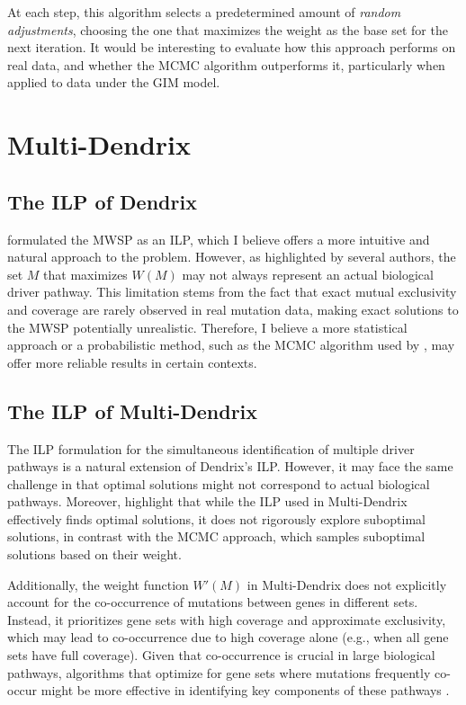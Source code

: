 At each step, this algorithm selects a predetermined amount of \textit{random adjustments}, choosing the one that maximizes the weight as the base set for the next iteration. It would be interesting to evaluate how this approach performs on real data, and whether the MCMC algorithm outperforms it, particularly when applied to data under the GIM model.

\section{Multi-Dendrix}

\subsection{The ILP of Dendrix}

\textcite{multi-dendrix} formulated the MWSP as an ILP, which I believe offers a more intuitive and natural approach to the problem. However, as highlighted by several authors, the set $M$ that maximizes $W(M)$ may not always represent an actual biological driver pathway. This limitation stems from the fact that exact mutual exclusivity and coverage are rarely observed in real mutation data, making exact solutions to the MWSP potentially unrealistic. Therefore, I believe a more statistical approach or a probabilistic method, such as the MCMC algorithm used by \textcite{dendrix}, may offer more reliable results in certain contexts.

\subsection{The ILP of Multi-Dendrix}

The ILP formulation for the simultaneous identification of multiple driver pathways is a natural extension of Dendrix's ILP. However, it may face the same challenge in that optimal solutions might not correspond to actual biological pathways. Moreover, \textcite{multi-dendrix} highlight that while the ILP used in Multi-Dendrix effectively finds optimal solutions, it does not rigorously explore suboptimal solutions, in contrast with the MCMC approach, which samples suboptimal solutions based on their weight.

Additionally, the weight function $W'(M)$ in Multi-Dendrix does not explicitly account for the co-occurrence of mutations between genes in different sets. Instead, it prioritizes gene sets with high coverage and approximate exclusivity, which may lead to co-occurrence due to high coverage alone (e.g., when all gene sets have full coverage). Given that co-occurrence is crucial in large biological pathways, algorithms that optimize for gene sets where mutations frequently co-occur might be more effective in identifying key components of these pathways \cite{multi-dendrix}.

